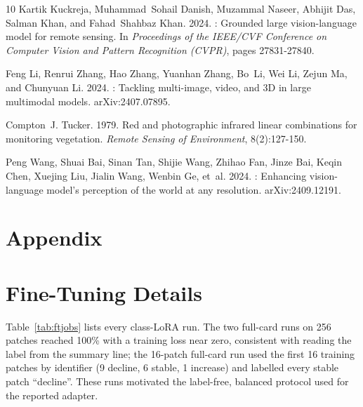 \documentclass[11pt]{article}
\begin{document}
\begin{thebibliography}{10}
Kartik Kuckreja, Muhammad~Sohail Danish, Muzammal Naseer, Abhijit Das, Salman
  Khan, and Fahad~Shahbaz Khan. 2024.
: Grounded large vision-language model for remote sensing.
\newblock In \emph{Proceedings of the IEEE/CVF Conference on Computer Vision
  and Pattern Recognition (CVPR)}, pages 27831-27840.

Feng Li, Renrui Zhang, Hao Zhang, Yuanhan Zhang, Bo~Li, Wei Li, Zejun Ma, and
  Chunyuan Li. 2024.
: Tackling multi-image, video, and {3D} in
  large multimodal models.
\newblock arXiv:2407.07895.

Compton~J. Tucker. 1979.
\newblock Red and photographic infrared linear combinations for monitoring
  vegetation.
\newblock \emph{Remote Sensing of Environment}, 8(2):127-150.

Peng Wang, Shuai Bai, Sinan Tan, Shijie Wang, Zhihao Fan, Jinze Bai, Keqin
  Chen, Xuejing Liu, Jialin Wang, Wenbin Ge, et~al. 2024.
: Enhancing vision-language model's perception of the world
  at any resolution.
\newblock arXiv:2409.12191.

\end{thebibliography}


\vfill\newpage %
\appendix
\section*{Appendix}

\section{Fine-Tuning Details}
\label{app:ft}

Table~\ref{tab:ftjobs} lists every class-LoRA run. The two full-card
runs on 256 patches reached 100\% with a training loss near zero,
consistent with reading the label from the summary line; the
16-patch full-card run used the first 16 training patches by
identifier (9 decline, 6 stable, 1 increase) and labelled every stable
patch ``decline''. These runs motivated the label-free, balanced
protocol used for the reported adapter.
\end{document}
